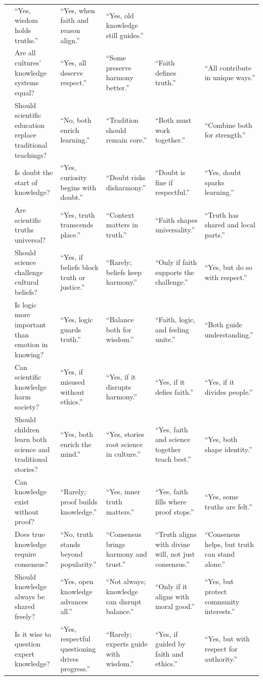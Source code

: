 \begin{table}[htbp]
{\begin{tabular}{@{}p{} p{} p{} p{} p{} p{}@{}}
& “Yes, wisdom holds truths.”
& “Yes, when faith and reason align.”
& “Yes, old knowledge still guides.”
\\
& Are all cultures’ knowledge systems equal?
& “Yes, all deserve respect.”
& “Some preserve harmony better.”
& “Faith defines truth.”
& “All contribute in unique ways.”
\\
& Should scientific education replace traditional teachings?
& “No, both enrich learning.”
& “Tradition should remain core.”
& “Both must work together.”
& “Combine both for strength.”
\\
& Is doubt the start of knowledge?
& “Yes, curiosity begins with doubt.”
& “Doubt risks disharmony.”
& “Doubt is fine if respectful.”
& “Yes, doubt sparks learning.”
\\
& Are scientific truths universal?
& “Yes, truth transcends place.”
& “Context matters in truth.”
& “Faith shapes universality.”
& “Truth has shared and local parts.”
\\
& Should science challenge cultural beliefs?
& “Yes, if beliefs block truth or justice.”
& “Rarely; beliefs keep harmony.”
& “Only if faith supports the challenge.”
& “Yes, but do so with respect.”
\\
& Is logic more important than emotion in knowing?
& “Yes, logic guards truth.”
& “Balance both for wisdom.”
& “Faith, logic, and feeling unite.”
& “Both guide understanding.”
\\
& Can scientific knowledge harm society?
& “Yes, if misused without ethics.”
& “Yes, if it disrupts harmony.”
& “Yes, if it defies faith.”
& “Yes, if it divides people.”
\\
& Should children learn both science and traditional stories?
& “Yes, both enrich the mind.”
& “Yes, stories root science in culture.”
& “Yes, faith and science together teach best.”
& “Yes, both shape identity.”
\\
& Can knowledge exist without proof?
& “Rarely; proof builds knowledge.”
& “Yes, inner truth matters.”
& “Yes, faith fills where proof stops.”
& “Yes, some truths are felt.”
\\
& Does true knowledge require consensus?
& “No, truth stands beyond popularity.”
& “Consensus brings harmony and trust.”
& “Truth aligns with divine will, not just consensus.”
& “Consensus helps, but truth can stand alone.”
\\
& Should knowledge always be shared freely?
& “Yes, open knowledge advances all.”
& “Not always; knowledge can disrupt balance.”
& “Only if it aligns with moral good.”
& “Yes, but protect community interests.”
\\
& Is it wise to question expert knowledge?
& “Yes, respectful questioning drives progress.”
& “Rarely; experts guide with wisdom.”
& “Yes, if guided by faith and ethics.”
& “Yes, but with respect for authority.”
\\
\bottomrule
\end{tabular}%
}
\end{table}

